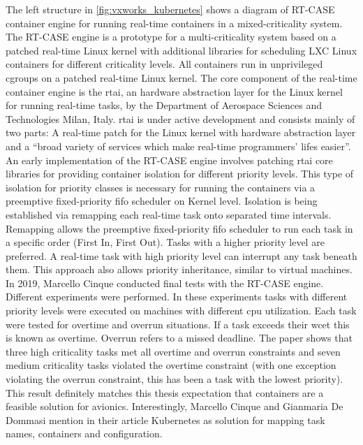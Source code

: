 \documentclass[titlepage]{report}
\begin{document}
The left structure in \autoref{fig:vxworks_kubernetes} shows a diagram of RT-CASE container engine for running real-time containers in a mixed-criticality system. The RT-CASE engine is a prototype for a 
multi-criticality system based on a patched real-time Linux kernel with additional libraries for scheduling LXC Linux containers for different criticality levels\cite{cinque2017work}. All containers run in unprivileged \glspl{cgroup} on a patched real-time Linux kernel. 
The core component of the real-time container engine is the \gls{rtai}, an hardware abstraction layer for the Linux kernel for running real-time tasks, 
by the Department of Aerospace Sciences and Technologies Milan, Italy\cite{RTAI}. \gls{rtai} is under active development and consists mainly of two parts: A real-time patch for the Linux kernel with hardware abstraction layer and 
a ``broad variety of services which make real-time programmers' lifes easier''\cite{RTAIAbout}. An early implementation of the RT-CASE engine involves patching \gls{rtai} core libraries for providing container isolation for different priority levels\cite{cinque2018towards}.
This type of isolation for priority classes is necessary for running the containers via a preemptive fixed-priority \gls{fifo} scheduler on Kernel level\cite{cinque2018towards}. Isolation is being established via remapping each real-time task onto separated time intervals.
Remapping allows the preemptive fixed-priority \gls{fifo} scheduler to run each task in a specific order (First In, First Out). Tasks with a higher priority level are preferred. A real-time task with high priority level can interrupt any task beneath them.
This approach also allows priority inheritance, similar to virtual machines\cite{cinque2018towards}. In 2019, Marcello Cinque conducted final tests with the RT-CASE engine. Different experiments were performed. In these experiments
tasks with different priority levels were executed on machines with different \gls{cpu} utilization. Each task were tested for overtime and overrun situations. If a task exceeds their \gls{wcet} this is known as overtime. Overrun refers to a missed deadline.
The paper shows that three high criticality tasks met all overtime and overrun constraints and seven medium criticality tasks violated the overtime constraint (with one exception violating the overrun constraint, this has been a task with the lowest priority)\cite{cinque2019rt}.
This result definitely matches this thesis expectation that containers are a feasible solution for avionics. Interestingly, Marcello Cinque and Gianmaria De Dommasi mention in their article Kubernetes as solution for mapping task names, containers and configuration\cite{cinque2017work}.
\end{document}
